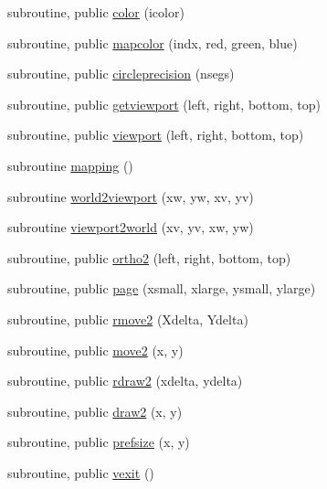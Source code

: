 \begin{DoxyCompactItemize}
\item 
subroutine, public \mbox{\hyperlink{namespacem__pixel_a334bde41bc7b2db19b950b1271ba7463}{color}} (icolor)
\item 
subroutine, public \mbox{\hyperlink{namespacem__pixel_a3422f51171f30979868a8075690da9f5}{mapcolor}} (indx, red, green, blue)
\item 
subroutine, public \mbox{\hyperlink{namespacem__pixel_a68ca1be8f7a92ece6efce8d69987af9c}{circleprecision}} (nsegs)
\item 
subroutine, public \mbox{\hyperlink{namespacem__pixel_a9f382cf8d3b69e11d1fdd2f2a4f59dea}{getviewport}} (left, right, bottom, top)
\item 
subroutine, public \mbox{\hyperlink{namespacem__pixel_a43247343cd316e3aa075b44b5166e2e9}{viewport}} (left, right, bottom, top)
\item 
subroutine \mbox{\hyperlink{namespacem__pixel_a84c841de62fc0addddeff305c4ede9d4}{mapping}} ()
\item 
subroutine \mbox{\hyperlink{namespacem__pixel_a9d4aea8ae2eb15317b83fa03a11371b2}{world2viewport}} (xw, yw, xv, yv)
\item 
subroutine \mbox{\hyperlink{namespacem__pixel_a9e23c9a3a5f3b1482986f067fbf8487f}{viewport2world}} (xv, yv, xw, yw)
\item 
subroutine, public \mbox{\hyperlink{namespacem__pixel_a80dece6adac704024a5a76efee697770}{ortho2}} (left, right, bottom, top)
\item 
subroutine, public \mbox{\hyperlink{namespacem__pixel_a6733a8657ca9f51b2648690dbae258c9}{page}} (xsmall, xlarge, ysmall, ylarge)
\item 
subroutine, public \mbox{\hyperlink{namespacem__pixel_a9b0fb9ccafe605fd6daf50c74347ed3a}{rmove2}} (Xdelta, Ydelta)
\item 
subroutine, public \mbox{\hyperlink{namespacem__pixel_ab5d4dc474ff84dc0f3f35f4a395979e0}{move2}} (x, y)
\item 
subroutine, public \mbox{\hyperlink{namespacem__pixel_a664375b036092dbebe1bccdc67254e1d}{rdraw2}} (xdelta, ydelta)
\item 
subroutine, public \mbox{\hyperlink{namespacem__pixel_a12012e819bb14b27d2b49732aa2e4e55}{draw2}} (x, y)
\item 
subroutine, public \mbox{\hyperlink{namespacem__pixel_acc868686f05b7e0b3cd33bf9d1c6bb98}{prefsize}} (x, y)
\item 
subroutine, public \mbox{\hyperlink{namespacem__pixel_a19ad6b65752322b0029a62cc0ebec3e8}{vexit}} ()
\item 

\end{DoxyCompactItemize}
